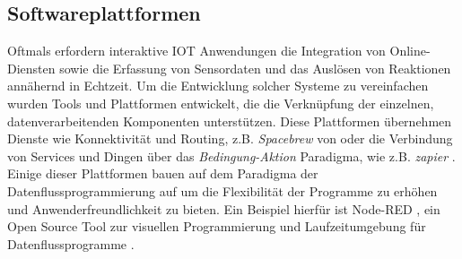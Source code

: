 \documentclass[BMR,Bachelor,ngerman]{twbook}%
\begin{document}
\subsection{Softwareplattformen}Oftmals erfordern interaktive \ac{IOT} Anwendungen die Integration von Online-Diensten sowie die Erfassung von Sensordaten und das Auslösen von Reaktionen annähernd in Echtzeit. Um die Entwicklung solcher Systeme zu vereinfachen wurden Tools und Plattformen entwickelt, die die Verknüpfung der einzelnen, datenverarbeitenden Komponenten unterstützen. Diese Plattformen übernehmen Dienste wie Konnektivität und Routing, z.B. \emph{Spacebrew} von  oder die Verbindung von Services und Dingen über das \emph{Bedingung-Aktion} Paradigma, wie z.B. \emph{zapier} \cite{zapier}. Einige dieser Plattformen bauen auf dem Paradigma der Datenflussprogrammierung auf um die Flexibilität der Programme zu erhöhen und Anwenderfreundlichkeit zu bieten. Ein Beispiel hierfür ist Node-RED \cite{nodered}, ein Open Source Tool zur visuellen Programmierung und Laufzeitumgebung für Datenflussprogramme \cite{giang2014toward}.
\end{document}
